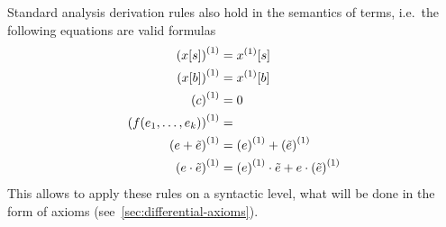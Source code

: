     \begin{lemma}[Derivations]\label{lm:derivations}
        Standard analysis derivation rules also hold in the semantics of \ddL terms, i.e.\ the following equations are valid \ddL formulas
        \begin{align}
            \D{(\x[s])} &= \Dx[s]\\
            \D{(\x[b])} &= \Dx[b]\\
            \D{(c)} &= 0\\
            \D{(f(\range{\istrm{1}}{\istrm{k}}))} &=\\
            \D{(\astrm+\bstrm)} &= \D{(\astrm)}+\D{(\bstrm)}\\
            \D{(\astrm\cdot\bstrm)} &= \D{(\astrm)}\cdot\bstrm + \astrm\cdot\D{(\bstrm)}\\
        \end{align}
        This allows to apply these rules on a syntactic level, what will be done in the form of axioms (see~\ref{sec:differential-axioms}).
    \end{lemma}
